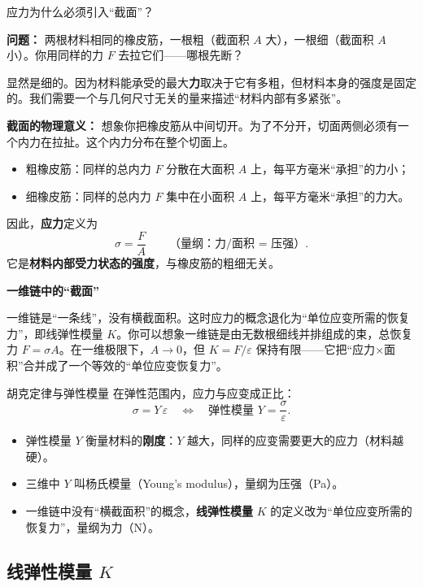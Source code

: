\begin{insightbox}{应力为什么必须引入``截面''？}

\textbf{问题：} 两根材料相同的橡皮筋，一根粗（截面积 $A$ 大），一根细（截面积 $A$ 小）。你用同样的力 $F$ 去拉它们——哪根先断？

显然是细的。因为材料能承受的最大\textbf{力}取决于它有多粗，但材料本身的强度是固定的。我们需要一个与几何尺寸无关的量来描述``材料内部有多紧张''。

\textbf{截面的物理意义：} 想象你把橡皮筋从中间切开。为了不分开，切面两侧必须有一个内力在拉扯。这个内力分布在整个切面上。
\begin{itemize}[nosep]
  \item 粗橡皮筋：同样的总内力 $F$ 分散在大面积 $A$ 上，每平方毫米``承担''的力小；
  \item 细橡皮筋：同样的总内力 $F$ 集中在小面积 $A$ 上，每平方毫米``承担''的力大。
\end{itemize}
因此，\textbf{应力}定义为
\[
  \boxed{ \sigma = \frac{F}{A} } \qquad \text{（量纲：力/面积 = 压强）}.
\]
它是\textbf{材料内部受力状态的强度}，与橡皮筋的粗细无关。

\textbf{一维链中的``截面''}

一维链是``一条线''，没有横截面积。这时应力的概念退化为``单位应变所需的恢复力''，即线弹性模量 $K$。你可以想象一维链是由无数根细线并排组成的束，总恢复力 $F = \sigma A$。在一维极限下，$A \to 0$，但 $K = F/\varepsilon$ 保持有限——它把``应力$\times$面积''合并成了一个等效的``单位应变恢复力''。
\end{insightbox}

\begin{modelbox}{胡克定律与弹性模量}
在弹性范围内，应力与应变成正比：
\[
  \sigma = Y \, \varepsilon \quad\Longleftrightarrow\quad \text{弹性模量 } Y = \frac{\sigma}{\varepsilon}.
\]
\begin{itemize}[nosep]
  \item 弹性模量 $Y$ 衡量材料的\textbf{刚度}：$Y$ 越大，同样的应变需要更大的应力（材料越硬）。
  \item 三维中 $Y$ 叫杨氏模量（Young's modulus），量纲为压强（Pa）。
  \item 一维链中没有``横截面积''的概念，\textbf{线弹性模量} $K$ 的定义改为``单位应变所需的恢复力''，量纲为力（N）。
\end{itemize}
\end{modelbox}

\subsection{线弹性模量 $K$}

